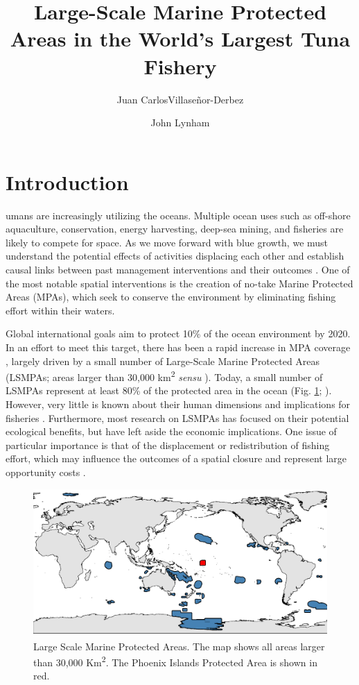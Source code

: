 \documentclass[9p,twocolumn,twoside,lineno]{pnas-new}
\title{Large-Scale Marine Protected Areas in the World's Largest Tuna Fishery}
\author[a,1]{Juan CarlosVillase\~{n}or-Derbez}
\author[b]{John Lynham}
\affil[a]{Bren School of Environmental Science \& Management, University of California at Santa Barbara, Santa Barbara, CA}
\affil[b]{Department of Economics, University of Hawaii at Manoa, Honolulu, HI}
\begin{document}
\maketitle
\thispagestyle{firststyle}


\section{Introduction}\label{introduction}

umans are increasingly utilizing the oceans. Multiple ocean uses such as off-shore aquaculture, conservation, energy harvesting, deep-sea mining, and fisheries are likely to compete for space. As we move forward with blue growth, we must understand the potential effects of activities displacing each other and establish causal links between past management interventions and their outcomes \citep{burgess_2018}. One of the most notable spatial interventions is the creation of no-take Marine Protected Areas (MPAs), which seek to conserve the environment by eliminating fishing effort within their waters.

Global international goals aim to protect 10\% of the ocean environment by 2020. In an effort to meet this target, there has been a rapid increase in MPA coverage \citep{wood_2008,sala_2018}, largely driven by a small number of Large-Scale Marine Protected Areas (LSMPAs; areas larger than 30,000 km\textsuperscript{2} \emph{sensu} \cite{desanto_2013}). Today, a small number of LSMPAs represent at least 80\% of the protected area in the ocean (Fig. \ref{fig:LSMPAs_map}; \citep{toonen_2013}). However, very little is known about their human dimensions and implications for fisheries \citep{gray_2017}. Furthermore, most research on LSMPAs has focused on their potential ecological benefits, but have left aside the economic implications. One issue of particular importance is that of the displacement or redistribution of fishing effort, which may influence the outcomes of a spatial closure and represent large opportunity costs \citep{smith_2003,smith_2010}.

\begin{figure}[H]
\centering
\includegraphics{img/LSMPAs_map.pdf}
\caption{\label{fig:LSMPAs_map}Large Scale Marine Protected Areas. The map shows all areas larger than 30,000 Km\textsuperscript{2}. The Phoenix Islands Protected Area is shown in red.}
\end{figure}
\end{document}
